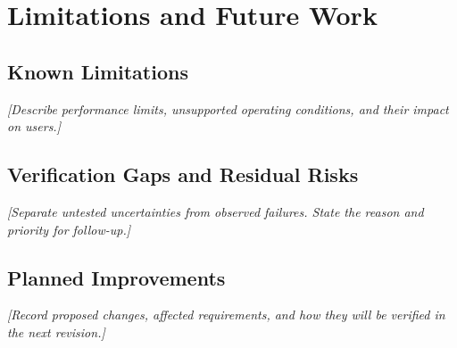 \chapter{Limitations and Future Work}

\section{Known Limitations}
\textit{[Describe performance limits, unsupported operating conditions, and their impact on users.]}

\section{Verification Gaps and Residual Risks}
\textit{[Separate untested uncertainties from observed failures. State the reason and priority for follow-up.]}

\section{Planned Improvements}
\textit{[Record proposed changes, affected requirements, and how they will be verified in the next revision.]}
